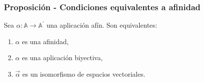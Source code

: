 \documentclass[12pt, a4paper, ones, notitlepage, openany,titlepage]{article}
\begin{document}
\subsubsection{Proposición - Condiciones equivalentes a afinidad}
	\noindent Sea $\alpha: \mathbb{A} \rightarrow \mathbb{A}^{\prime}$ una aplicación afín. Son equivalentes:
	\begin{enumerate}[label=(\arabic*)]
		\item $\alpha$ es una afinidad,
		
		\item $\alpha$ es una aplicación biyectiva,
		
		\item $\overrightarrow{\alpha}$ es un isomorfismo de espacios vectoriales.
	\end{enumerate}
\end{document}
